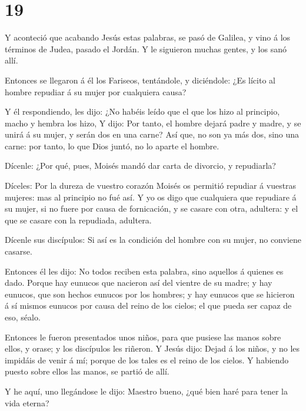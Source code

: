 \hypertarget{section-18}{%
\section{19}\label{section-18}}

 Y aconteció que acabando Jesús estas palabras, se pasó de
Galilea, y vino á los términos de Judea, pasado el Jordán. 
Y le siguieron muchas gentes, y los sanó allí.

 Entonces se llegaron á él los Fariseos, tentándole, y
diciéndole: ¿Es lícito al hombre repudiar á su mujer por cualquiera
causa?

 Y él respondiendo, les dijo: ¿No habéis leído que el que
los hizo al principio, macho y hembra los hizo,  Y dijo: Por
tanto, el hombre dejará padre y madre, y se unirá á su mujer, y serán
dos en una carne?  Así que, no son ya más dos, sino una
carne: por tanto, lo que Dios juntó, no lo aparte el hombre.

 Dícenle: ¿Por qué, pues, Moisés mandó dar carta de
divorcio, y repudiarla?

 Díceles: Por la dureza de vuestro corazón Moisés os
permitió repudiar á vuestras mujeres: mas al principio no fué así.
 Y yo os digo que cualquiera que repudiare á su mujer, si no
fuere por causa de fornicación, y se casare con otra, adultera: y el que
se casare con la repudiada, adultera.

 Dícenle sus discípulos: Si así es la condición del hombre
con su mujer, no conviene casarse.

 Entonces él les dijo: No todos reciben esta palabra, sino
aquellos á quienes es dado.  Porque hay eunucos que
nacieron así del vientre de su madre; y hay eunucos, que son hechos
eunucos por los hombres; y hay eunucos que se hicieron á sí mismos
eunucos por causa del reino de los cielos; el que pueda ser capaz de
eso, séalo.

 Entonces le fueron presentados unos niños, para que
pusiese las manos sobre ellos, y orase; y los discípulos les riñeron.
 Y Jesús dijo: Dejad á los niños, y no les impidáis de
venir á mí; porque de los tales es el reino de los cielos. 
Y habiendo puesto sobre ellos las manos, se partió de allí.

 Y he aquí, uno llegándose le dijo: Maestro bueno, ¿qué
bien haré para tener la vida eterna?


